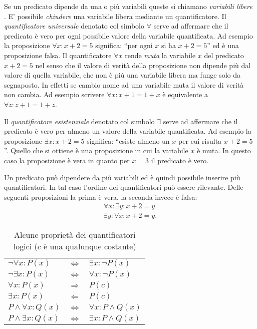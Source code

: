 Se un predicato dipende da una o più variabili queste
si chiamano \emph{variabili libere}%
%
. E' possibile
\emph{chiudere} una variabile libera mediante un quantificatore.
Il \emph{quantificatore universale}%
%
 denotato col simbolo
$\forall$ serve ad affermare che il predicato è vero
per ogni possibile valore della variabile quantificata.
Ad esempio la proposizione $\forall x\colon x+2=5$ significa:
``per ogni $x$ si ha $x+2=5$'' ed è una proposizione falsa.
Il quantificatore $\forall x$ rende \emph{muta} la variabile
$x$ del predicato $x+2=5$ nel senso che il valore di verità 
della proposizione
non dipende più dal valore di quella variabile, che non è
più una variabile libera ma funge solo da segnaposto.
In effetti se cambio nome ad una variabile muta il valore 
di verità non cambia. Ad esempio scrivere $\forall x\colon x+1=1+x$
è equivalente a $\forall z\colon z+1=1+z$.

Il \emph{quantificatore esistenziale}%
%
 denotato col simbolo
$\exists$ serve ad affermare che il predicato è vero per
almeno un valore della variabile quantificata.
Ad esempio la proposizione $\exists x\colon x+2=5$ significa:
``esiste almeno un $x$ per cui risulta $x+2=5$''.
Quello che si ottiene è una proposizione in cui la variabile
$x$ è muta. In questo caso la proposizione è vera in quanto
per $x=3$ il predicato è vero.

Un predicato può dipendere da più variabili ed è quindi
possibile inserire più quantificatori. In tal caso l'ordine
dei quantificatori può essere rilevante.
Delle seguenti proposizioni la prima è vera, la seconda
invece è falsa:
\begin{gather*}
\forall x\colon \exists y\colon x+2=y \\
\exists y\colon \forall x\colon x+2=y.
\end{gather*}

\begin{table}
\begin{center}
\begin{tabular}{lcl}
$\lnot \forall x \colon P(x)$ & $\iff$ & $\exists x \colon \lnot P(x)$\\
$\lnot \exists x \colon P(x)$ & $\iff$ & $\forall x \colon \lnot P(x)$\\
$\forall x \colon P(x)$ & $\Longrightarrow$ & $P(c)$\\
$\exists x \colon P(x)$ & $\Longleftarrow$ & $P(c)$\\
$P \land \forall x \colon Q(x)$ & $\iff$ & $\forall x\colon P\land Q(x)$\\
$P \land \exists x \colon Q(x)$ & $\iff$ & $\exists x \colon P \land Q(x)$
\end{tabular}
\end{center}
\caption{Alcune proprietà dei quantificatori logici ($c$ è una qualunque costante)}
\label{tab:proprieta_quantificatori}
\end{table}

